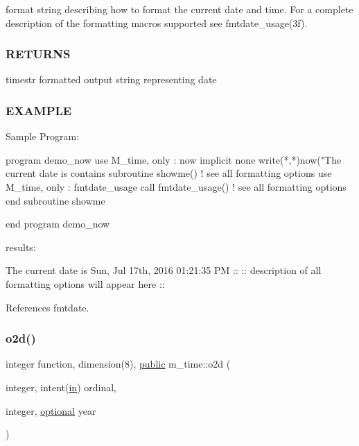 \begin{DoxyVerb}
format string describing how to format the current date and time. For a complete description of the formatting macros supported see fmtdate\+\_\+usage(3f). \subsubsection*{R\+E\+T\+U\+R\+NS}

timestr formatted output string representing date

\subsubsection*{E\+X\+A\+M\+P\+LE}

\begin{DoxyVerb}Sample Program:

 program demo_now
 use M_time, only : now
 implicit none
    write(*,*)now("The current date is %
 contains
 subroutine showme() ! see all formatting options
    use M_time, only : fmtdate_usage
    call fmtdate_usage() ! see all formatting options
 end subroutine showme

 end program demo_now

results:

   The current date is Sun, Jul 17th, 2016 01:21:35 PM
    ::
    :: description of all formatting options will appear here
    :: \end{DoxyVerb}
 

References fmtdate.

\mbox{\label{namespacem__time_a55e2cb9efc9d4d209ae2864f073d4f19}} 
\subsubsection{\texorpdfstring{o2d()}{o2d()}}
{\footnotesize\ttfamily integer function, dimension(8), \hyperlink{M__stopwatch_83_8txt_a2f74811300c361e53b430611a7d1769f}{public} m\+\_\+time\+::o2d (\begin{DoxyParamCaption}\item[{integer, intent(\hyperlink{M__journal_83_8txt_afce72651d1eed785a2132bee863b2f38}{in})}]{ordinal,  }\item[{integer, \hyperlink{option__stopwatch_83_8txt_aa4ece75e7acf58a4843f70fe18c3ade5}{optional}}]{year }\end{DoxyParamCaption})}




\end{DoxyVerb}
